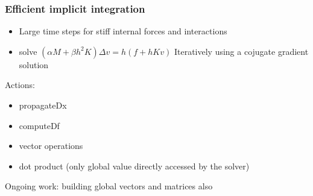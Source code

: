 \documentclass[a4paper,compress]{beamer}
\begin{document}
% 
% 



\begin{frame}
 \frametitle{Efficient implicit integration}
\begin{itemize}
 \item Large time steps for stiff internal forces and interactions
 \item solve $ (\alpha M + \beta h^2 K ) \Delta v = h( f + hKv) $ Iteratively using a cojugate gradient solution
\end{itemize}
 Actions:
\begin{itemize}
 \item propagateDx
 \item computeDf
 \item vector operations
 \item dot product (only global value directly accessed by the solver)
\end{itemize}
Ongoing work: building global vectors and matrices also
\end{frame}
\end{document}
